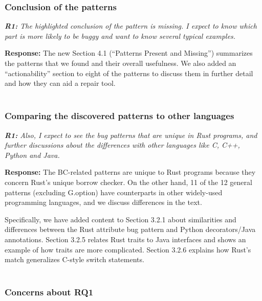 \documentclass{article}
\begin{document}
\subsubsection{\label{rev:1:conclusion}Conclusion of the patterns}

\textit{\textbf{R1:} The highlighted conclusion of the pattern is missing. I expect to know which part is more likely to be buggy and want to know several typical examples.}

\vspace*{1em} \noindent \textbf{Response:} The new Section 4.1 (``Patterns Present and Missing'') summarizes the patterns that we found and their overall usefulness. We also added an “actionability” section to eight of the patterns to discuss them in further detail and how they can aid a repair tool. \\ \\

\subsubsection{\label{rev:1:compare}Comparing the discovered patterns to other languages}

\textit{\textbf{R1:} Also, I expect to see the bug patterns that are unique in Rust programs, and further discussions about the differences with other languages like C, C++, Python and Java. }

\vspace*{1em} \noindent \textbf{Response:} The BC-related patterns are unique to Rust programs because they concern Rust's unique borrow checker. On the other hand, 11 of the 12 general patterns (excluding G.option) have counterparts in other widely-used programming languages, and we discuss differences in the text.

Specifically, we have added content to Section 3.2.1 about similarities and differences between the Rust attribute bug pattern and Python decorators/Java annotations. Section 3.2.5 relates Rust traits to Java interfaces and shows an example of how traits are more complicated. Section 3.2.6 explains how Rust's match generalizes C-style switch statements. \\ \\

\subsubsection{\label{rev:1:rq1}Concerns about RQ1}
\end{document}
